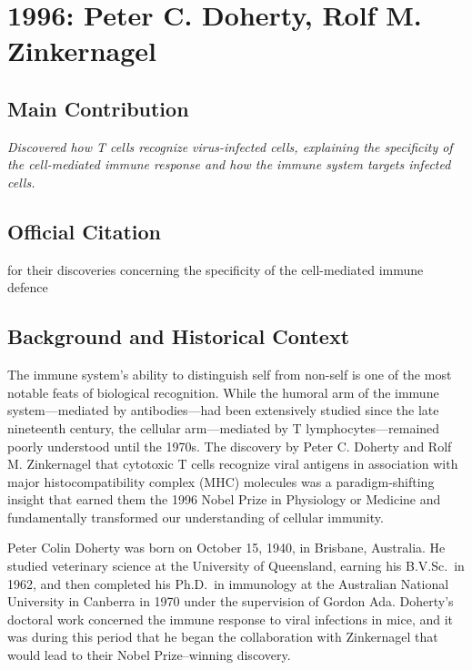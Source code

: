 \chapter[1996 --- Doherty et al.]{1996: Peter C. Doherty, Rolf M. Zinkernagel}
\label{ch:1996_Doherty}

\section*{Main Contribution}

\textit{Discovered how T cells recognize virus-infected cells, explaining the specificity of the cell-mediated immune response and how the immune system targets infected cells.}\cite{nobel-1996,lecture-1996}

\section{Official Citation}

for their discoveries concerning the specificity of the cell-mediated immune defence

\section{Background and Historical Context}

The immune system's ability to distinguish self from non-self is one of the most notable feats of biological recognition. While the humoral arm of the immune system---mediated by antibodies---had been extensively studied since the late nineteenth century, the cellular arm---mediated by T lymphocytes---remained poorly understood until the 1970s. The discovery by Peter C. Doherty and Rolf M. Zinkernagel that cytotoxic T cells recognize viral antigens in association with major histocompatibility complex (MHC) molecules was a paradigm-shifting insight that earned them the 1996 Nobel Prize in Physiology or Medicine and fundamentally transformed our understanding of cellular immunity.

Peter Colin Doherty was born on October 15, 1940, in Brisbane, Australia. He studied veterinary science at the University of Queensland, earning his B.V.Sc.\ in 1962, and then completed his Ph.D.\ in immunology at the Australian National University in Canberra in 1970 under the supervision of Gordon Ada. Doherty's doctoral work concerned the immune response to viral infections in mice, and it was during this period that he began the collaboration with Zinkernagel that would lead to their Nobel Prize--winning discovery.

